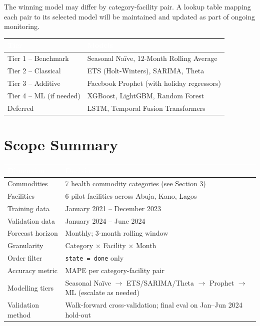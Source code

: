 \documentclass[12pt, a4paper]{article}
\begin{document}
The winning model may differ by category-facility pair. A lookup table
mapping each pair to its selected model will be maintained and updated as
part of ongoing monitoring.

\vspace{0.6em}
\noindent
\begin{tabularx}{\textwidth}{@{} L{3.8cm} X @{}}
  \toprule
  \textcolor{white}{\textbf{Tier}} &
  \textcolor{white}{\textbf{Models}} \\
  \midrule
  Tier 1 -- Benchmark      & Seasonal Na\"{i}ve, 12-Month Rolling Average \\
  \addlinespace[2pt]
  Tier 2 -- Classical      & ETS (Holt-Winters), SARIMA, Theta \\
  \addlinespace[2pt]
  Tier 3 -- Additive       & Facebook Prophet (with holiday regressors) \\
  \addlinespace[2pt]
  Tier 4 -- ML (if needed) & XGBoost, LightGBM, Random Forest \\
  \addlinespace[2pt]
  Deferred                 & LSTM, Temporal Fusion Transformers \\
  \bottomrule
\end{tabularx}

\section{Scope Summary}

\vspace{0.4em}
\noindent
\begin{tabularx}{\textwidth}{@{} L{3.8cm} X @{}}
  \toprule
  \textcolor{white}{\textbf{Dimension}} &
  \textcolor{white}{\textbf{Decision}} \\
  \midrule
  Commodities       & 7 health commodity categories (see Section 3) \\
  \addlinespace[2pt]
  Facilities        & 6 pilot facilities across Abuja, Kano, Lagos \\
  \addlinespace[2pt]
  Training data     & January 2021 -- December 2023 \\
  \addlinespace[2pt]
  Validation data   & January 2024 -- June 2024 \\
  \addlinespace[2pt]
  Forecast horizon  & Monthly; 3-month rolling window \\
  \addlinespace[2pt]
  Granularity       & Category $\times$ Facility $\times$ Month \\
  \addlinespace[2pt]
  Order filter      & \texttt{state = done} only \\
  \addlinespace[2pt]
  Accuracy metric   & MAPE per category-facility pair \\
  \addlinespace[2pt]
  Modelling tiers   & Seasonal Na\"{i}ve $\to$ ETS/SARIMA/Theta $\to$
                      Prophet $\to$ ML (escalate as needed) \\
  \addlinespace[2pt]
  Validation method & Walk-forward cross-validation; final eval on
                      Jan--Jun 2024 hold-out \\
  \bottomrule
\end{tabularx}
\end{document}
